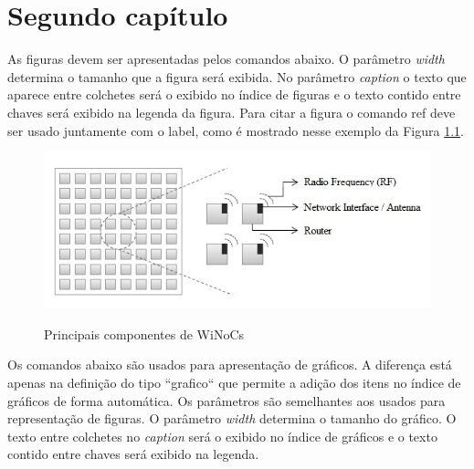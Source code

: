 \chapter{Segundo capítulo}
\label{cap2}

\vspace{-1.9cm}

  
  As figuras devem ser apresentadas pelos comandos abaixo. O parâmetro \textit{width} determina o tamanho que a figura
  será exibida. No parâmetro \textit{caption} o texto que aparece entre colchetes será o exibido no índice de figuras e o texto
  contido entre chaves será exibido na legenda da figura. Para citar a figura o comando ref deve ser usado juntamente
  com o label, como é mostrado nesse exemplo da Figura \ref{fig:ComponentesWiNoC}.

  \begin{figure}[H]
  \setlength{\abovecaptionskip}{0pt}
  \setlength{\belowcaptionskip}{0pt}
  \caption[Principais componentes de WiNoCs]{Principais componentes de WiNoCs}
  \centering
  \includegraphics[width=.85\textwidth]{imagem/winoc.jpg}
  \captionsetup{justification=centering}
  \label{fig:ComponentesWiNoC}
  \end{figure}


  Os comandos abaixo são usados para apresentação de gráficos. A diferença está apenas na definição do tipo ``grafico`` 
  que permite a adição dos itens no índice de gráficos de forma automática. Os parâmetros são semelhantes aos usados para
  representação de figuras. O parâmetro \textit{width} determina o tamanho do gráfico. O texto entre colchetes 
  no \textit{caption} será o exibido no índice de gráficos e o texto contido entre chaves será exibido na legenda.

